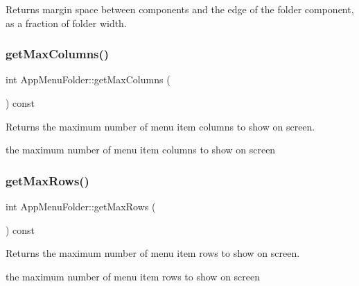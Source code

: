 \begin{DoxyReturn}{Returns}
margin space between components and the edge of the folder component, as a fraction of folder width. 
\end{DoxyReturn}
\mbox{\label{classAppMenuFolder_ac939a6904f7db98f2b0d3150b4b5b129}} 
\subsubsection{\texorpdfstring{get\+Max\+Columns()}{getMaxColumns()}}
{\footnotesize\ttfamily int App\+Menu\+Folder\+::get\+Max\+Columns (\begin{DoxyParamCaption}{ }\end{DoxyParamCaption}) const\hspace{0.3cm}{\ttfamily [protected]}}

\begin{DoxyReturn}{Returns}
the maximum number of menu item columns to show on screen.

the maximum number of menu item columns to show on screen 
\end{DoxyReturn}
\mbox{\label{classAppMenuFolder_a0a229d968e406f5811b0d7ee32ea0273}} 
\subsubsection{\texorpdfstring{get\+Max\+Rows()}{getMaxRows()}}
{\footnotesize\ttfamily int App\+Menu\+Folder\+::get\+Max\+Rows (\begin{DoxyParamCaption}{ }\end{DoxyParamCaption}) const\hspace{0.3cm}{\ttfamily [protected]}}

\begin{DoxyReturn}{Returns}
the maximum number of menu item rows to show on screen.

the maximum number of menu item rows to show on screen 
\end{DoxyReturn}
\mbox{\label{classAppMenuFolder_a2284abcccdf73647d1009456fa67dc79}} 
